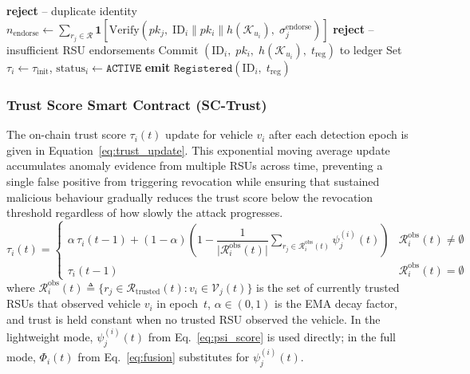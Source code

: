 \documentclass[12pt, a4paper]{report}
\begin{document}
\begin{algorithm}[htb]
\caption{Registration Smart Contract (\texttt{SC-Register})}
\begin{algorithmic}[1]
  \small
    \State \textbf{reject} -- duplicate identity
  \EndIf
  \State $n_{\mathrm{endorse}} \gets \sum_{r_j \in \mathcal{R}}
    \mathbf{1}\!\left[\mathrm{Verify}(pk_j,\;
    \mathrm{ID}_i \| pk_i \| h(\mathcal{K}_{u_i}),\;
    \sigma_j^{\mathrm{endorse}})\right]$
    \State \textbf{reject} -- insufficient RSU endorsements
  \EndIf
  \State Commit $(\mathrm{ID}_i,\; pk_i,\;
    h(\mathcal{K}_{u_i}),\; t_{\mathrm{reg}})$ to ledger
  \State Set $\tau_i \gets \tau_{\mathrm{init}}$,\;
    $\mathrm{status}_i \gets \texttt{ACTIVE}$
  \State \textbf{emit} $\texttt{Registered}(\mathrm{ID}_i,\;
    t_{\mathrm{reg}})$
  \EndProcedure
\end{algorithmic}
\label{alg:sc_register}
\end{algorithm}

\subsubsection{Trust Score Smart Contract (SC-Trust)}

The on-chain trust score $\tau_i(t)$ update for vehicle $v_i$ after
each detection epoch is given in Equation~\ref{eq:trust_update}. This exponential moving average update accumulates anomaly evidence
from multiple RSUs across time, preventing a single false positive
from triggering revocation while ensuring that sustained malicious
behaviour gradually reduces the trust score below the revocation
threshold regardless of how slowly the attack progresses.
\begin{equation}
  \tau_i(t) =
  \begin{cases}
    \alpha\,\tau_i(t-1)
    + (1-\alpha)\!\left(1 -
      \dfrac{1}{\bigl|\mathcal{R}^{\mathrm{obs}}_i(t)\bigr|}
      \displaystyle\sum_{r_j \in \mathcal{R}^{\mathrm{obs}}_i(t)}
      \psi_j^{(i)}(t)\right)
    & \mathcal{R}^{\mathrm{obs}}_i(t) \neq \emptyset \\[6pt]
    \tau_i(t-1) & \mathcal{R}^{\mathrm{obs}}_i(t) = \emptyset
  \end{cases}
  \label{eq:trust_update}
\end{equation}
where
$\mathcal{R}^{\mathrm{obs}}_i(t)
  \triangleq \{r_j \in \mathcal{R}_{\mathrm{trusted}}(t)
  : v_i \in \mathcal{V}_j(t)\}$
is the set of currently trusted RSUs that observed vehicle $v_i$
in epoch~$t$, $\alpha \in (0,1)$ is the EMA decay factor, and
trust is held constant when no trusted RSU observed the vehicle.
In the lightweight mode, $\psi_j^{(i)}(t)$ from
Eq.~\eqref{eq:psi_score} is used directly; in the full mode,
$\Phi_i(t)$ from Eq.~\eqref{eq:fusion} substitutes for
$\psi_j^{(i)}(t)$.
\end{document}
